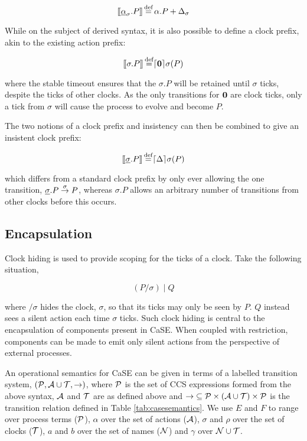 \begin{equation}
[\hspace{-0.3ex}[ \underline{\alpha}_{\sigma}.P ]\hspace{-0.3ex}] \operatorname{\stackrel{\textrm{def}}{=}} \alpha.P + \Delta_{\sigma} 
\end{equation}

While on the subject of derived syntax, it is also possible to define
a clock prefix, akin to the existing action prefix:

\begin{equation}
[\hspace{-0.3ex}[ \sigma.P ]\hspace{-0.3ex}] \operatorname{\stackrel{\textrm{def}}{=}} \lceil{\textbf{0}}\rceil {\sigma} ({P})
\end{equation}

\noindent where the stable timeout ensures that the $\sigma.P$ will be
retained until $\sigma$ ticks, despite the ticks of other clocks.  As
the only transitions for $\textbf{0}$ are clock ticks, only a tick from
$\sigma$ will cause the process to evolve and become $P$.

The two notions of a clock prefix and insistency can then be combined
to give an insistent clock prefix:

\begin{equation}
[\hspace{-0.3ex}[ \underline{\sigma}.P ]\hspace{-0.3ex}] \operatorname{\stackrel{\textrm{def}}{=}} \lceil{\Delta}\rceil {\sigma} ({P})
\end{equation}

\noindent which differs from a standard clock prefix by only ever
allowing the one transition, $\underline{\sigma}.P \stackrel{\sigma}{\rightarrow}
P$, whereas $\sigma.P$ allows an arbitrary number of transitions from
other clocks before this occurs.

\subsection{Encapsulation}

Clock hiding is used to provide scoping for the ticks of a
clock.  Take the following situation,

\begin{equation}
\label{clockhidingex}
  (P / \sigma)\;|\;Q
\end{equation}

\noindent where $/ \sigma$ hides the clock, $\sigma$, so that its
ticks may only be seen by $P$.  $Q$ instead sees a silent action each
time $\sigma$ ticks.  Such clock hiding is central to the
encapsulation of components present in CaSE.  When coupled with
restriction, components can be made to emit only silent actions from
the perspective of external processes.

An operational semantics for CaSE can be given in terms of a labelled
transition system, $(\text{$\mathcal{P}$}, \text{$\mathcal{A}$} \cup \text{$\mathcal{T}$}, \rightarrow)$,
where $\text{$\mathcal{P}$}$ is the set of CCS expressions formed from the above
syntax, $\text{$\mathcal{A}$}$ and $\text{$\mathcal{T}$}$ are as defined above and
$\mathop{\rightarrow} \mathrel{\subseteq} \text{$\mathcal{P}$} \times (\text{$\mathcal{A}$} \cup
\text{$\mathcal{T}$}) \times \text{$\mathcal{P}$}$ is the transition relation defined in Table
\ref{tab:casesemantics}.  We use $E$ and $F$ to range over process
terms ($\text{$\mathcal{P}$}$), $\alpha$ over the set of actions ($\text{$\mathcal{A}$}$),
$\sigma$ and $\rho$ over the set of clocks ($\text{$\mathcal{T}$}$), $a$ and $b$
over the set of names ($\text{$\mathcal{N}$}$) and $\gamma$ over $\text{$\mathcal{N}$} \cup
\text{$\mathcal{T}$}$.

